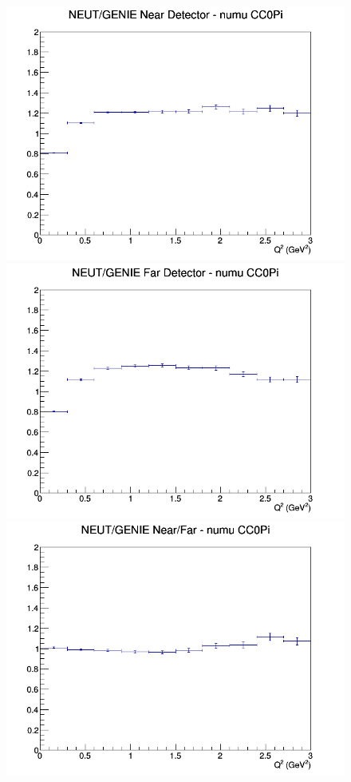 \documentclass[12pt]{article}
\begin{document}
\begin{figure}[h]
\endminipage
\newline
{}
\includegraphics[width=\linewidth]{eff_Q2/LAr/ratios/CC0Pi_NEUT_GENIE_numu_near_Q2.png}
\endminipage
{}
\includegraphics[width=\linewidth]{eff_Q2/LAr/ratios/CC0Pi_NEUT_GENIE_numu_far_Q2.png}
\endminipage
{}
\includegraphics[width=\linewidth]{eff_Q2/LAr/ratios/CC0Pi_NEUT_GENIE_numu_NF_Q2.png}

\end{figure}
\end{document}
